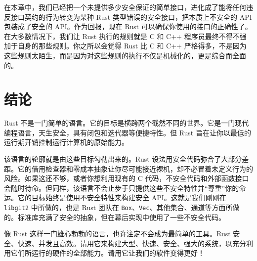 在本章中，我们已经把一个未提供多少安全保证的简单接口，进化成了能将任何违反接口契约的行为转变为某种 Rust 类型错误的安全接口，把本质上不安全的 API 包装成了安全的 API。作为回报，现在 Rust 可以确保你使用的接口的正确性了。在大多数情况下，我们让 Rust 执行的规则就是 C 和 C++ 程序员最终不得不强加于自身的那些规则。你之所以会觉得 Rust 比 C 和 C++ 严格得多，不是因为这些规则太陌生，而是因为对这些规则的执行不仅是机械化的，更是综合而全面的。

\section{结论}

Rust 不是一门简单的语言。它的目标是横跨两个截然不同的世界。它是一门现代编程语言，天生安全，具有闭包和迭代器等便捷特性。但 Rust 旨在让你以最低的运行期开销控制运行计算机的原始能力。

该语言的轮廓就是由这些目标勾勒出来的。Rust 设法用安全代码弥合了大部分差距。它的借用检查器和零成本抽象让你尽可能接近裸机，却不必冒着未定义行为的风险。如果这还不够，或者你想利用现有的 C 代码，不安全代码和外部函数接口会随时待命。但同样，该语言不会止步于只提供这些不安全特性并“尊重”你的命运。它的目标始终是使用不安全特性来构建安全 API。这就是我们刚刚在 \texttt{libgit2} 中所做的，也是 Rust 团队在 \texttt{Box}、\texttt{Vec}、其他集合、通道等方面所做的。标准库充满了安全的抽象，但在幕后实现中使用了一些不安全代码。

像 Rust 这样一门雄心勃勃的语言，也许注定不会成为最简单的工具。Rust 安全、快速、并发且高效。请用它来构建大型、快速、安全、强大的系统，以充分利用它们所运行的硬件的全部能力。请用它让我们的软件变得更好！

